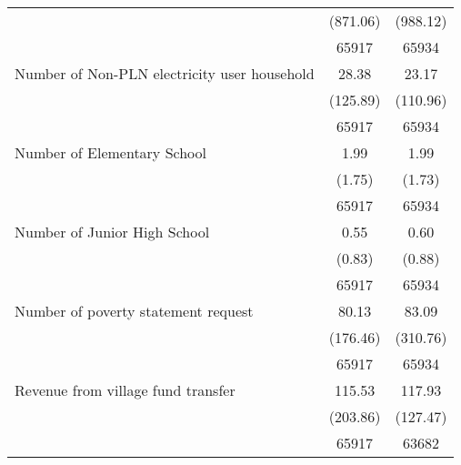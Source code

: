 \begin{tabular}{l*{2}{c}}
                    &    (871.06)&    (988.12)\\
                    &       65917&       65934\\
[1em]
Number of Non-PLN electricity user household&       28.38&       23.17\\
                    &    (125.89)&    (110.96)\\
                    &       65917&       65934\\
[1em]
Number of Elementary School&        1.99&        1.99\\
                    &      (1.75)&      (1.73)\\
                    &       65917&       65934\\
[1em]
Number of Junior High School&        0.55&        0.60\\
                    &      (0.83)&      (0.88)\\
                    &       65917&       65934\\
[1em]
Number of poverty statement request&       80.13&       83.09\\
                    &    (176.46)&    (310.76)\\
                    &       65917&       65934\\
[1em]
Revenue from village fund transfer&      115.53&      117.93\\
                    &    (203.86)&    (127.47)\\
                    &       65917&       63682\\
\hline\hline
\end{tabular}
